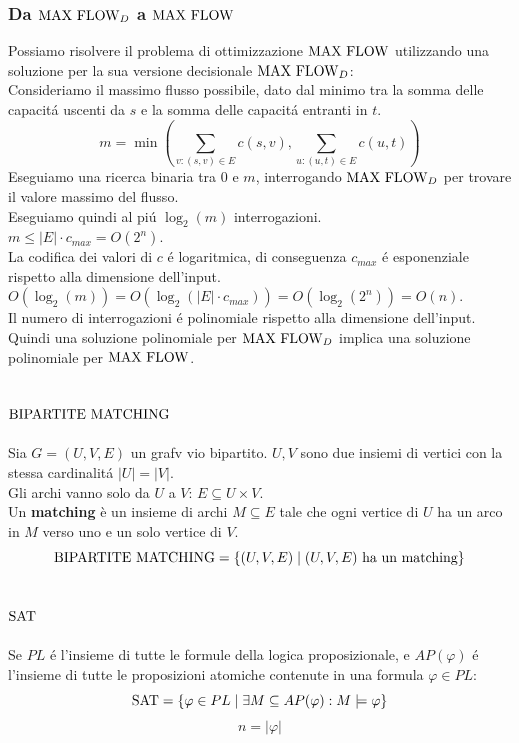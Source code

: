 \subsubsection{Da $\text{MAX FLOW}_D$ a $\text{MAX FLOW}$}
Possiamo risolvere il problema di ottimizzazione $\text{MAX FLOW}$ utilizzando una soluzione per la sua versione decisionale $\text{MAX FLOW}_D$: \\
Consideriamo il massimo flusso possibile, dato dal minimo tra la somma delle capacitá uscenti da $s$ e la somma delle capacitá entranti in $t$. \\
\[
m = \min\left(\sum_{v : (s,v) \in E} c(s, v), \sum_{u : (u, t) \in E} c(u, t)\right)
\]
Eseguiamo una ricerca binaria tra $0$ e $m$, interrogando $\text{MAX FLOW}_D$ per trovare il valore massimo del flusso. \\
Eseguiamo quindi al piú $\log_2(m)$ interrogazioni. \\
$m \leq |E| \cdot c_{max} = O(2^n)$. \\
La codifica dei valori di $c$ é logaritmica, di conseguenza $c_{max}$ é esponenziale rispetto alla dimensione dell'input. \\
$O(\log_2(m)) = O(\log_2(|E| \cdot c_{max})) = O(\log_2(2^n)) = O(n)$. \\
Il numero di interrogazioni é polinomiale rispetto alla dimensione dell'input. \\
Quindi una soluzione polinomiale per $\text{MAX FLOW}_D$ implica una soluzione polinomiale per $\text{MAX FLOW}$.


\subsection{$\text{BIPARTITE MATCHING}$}
Sia $G = (U, V, E)$ un grafv vio bipartito. $U, V$ sono due insiemi di vertici con la stessa cardinalitá $|U| = |V|$. \\ 
Gli archi vanno solo da $U$ a $V$: $E \subseteq U \times V$. \\
Un \textbf{matching} è un insieme di archi $M \subseteq E$ tale che ogni vertice di $U$ ha un arco in $M$ verso uno e un solo vertice di $V$.
\[
\text{BIPARTITE MATCHING} = \{ (U, V, E) \mid (U, V, E) \text{ ha un matching} \}
\]


\subsection{$\text{SAT}$}
\label{problema:sat}
Se $PL$ é l'insieme di tutte le formule della logica proposizionale, 
e $AP(\varphi)$ é l'insieme di tutte le proposizioni atomiche contenute 
in una formula $\varphi \in PL$:
\[
\text{SAT} = \{ \varphi \in PL \mid \exists M \subseteq AP(\varphi) : M \models \varphi \} 
\]
\[
n = |\varphi|
\]

